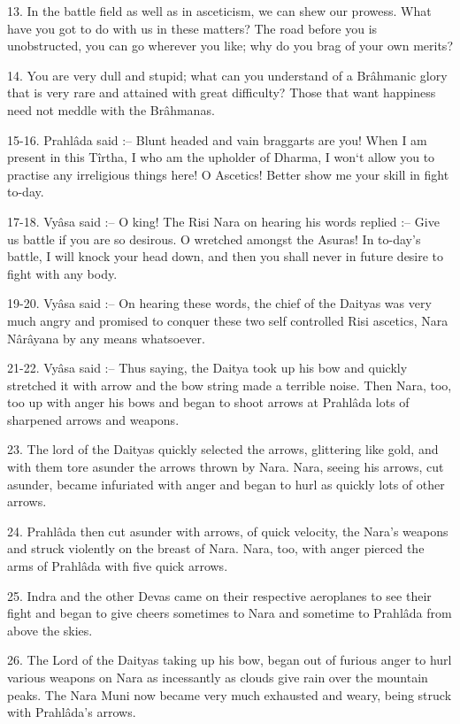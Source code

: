 13. In the battle field as well as in asceticism, we can shew our prowess. What have you got to do with us in these matters? The road before you is unobstructed, you can go wherever you like; why do you brag of your own merits?

14. You are very dull and stupid; what can you understand of a Br\^ahmanic glory that is very rare and attained with great difficulty? Those that want happiness need not meddle with the Br\^ahmanas.

15-16. Prahl\^ada said :-- Blunt headed and vain braggarts are you! When I am present in this T\^irtha, I who am the upholder of Dharma, I won`t allow you to practise any irreligious things here! O Ascetics! Better show me your skill in fight to-day.

17-18. Vy\^asa said :-- O king! The Risi Nara on hearing his words replied :-- Give us battle if you are so desirous. O wretched amongst the Asuras! In to-day's battle, I will knock your head down, and then you shall never in future desire to fight with any body.

19-20. Vy\^asa said :-- On hearing these words, the chief of the Daityas was very much angry and promised to conquer these two self controlled Risi ascetics, Nara N\^ar\^ayana by any means whatsoever.

21-22. Vy\^asa said :-- Thus saying, the Daitya took up his bow and quickly stretched it with arrow and the bow string made a terrible noise. Then Nara, too, too up with anger his bows and began to shoot arrows at Prahl\^ada lots of sharpened arrows and weapons.

23. The lord of the Daityas quickly selected the arrows, glittering like gold, and with them tore asunder the arrows thrown by Nara. Nara, seeing his arrows, cut asunder, became infuriated with anger and began to hurl as quickly lots of other arrows.

24. Prahl\^ada then cut asunder with arrows, of quick velocity, the Nara's weapons and struck violently on the breast of Nara. Nara, too, with anger pierced the arms of Prahl\^ada with five quick arrows.

25. Indra and the other Devas came on their respective aeroplanes to see their fight and began to give cheers sometimes to Nara and sometime to Prahl\^ada from above the skies.

26. The Lord of the Daityas taking up his bow, began out of furious anger to hurl various weapons on Nara as incessantly as clouds give rain over the mountain peaks. The Nara Muni now became very much exhausted and weary, being struck with Prahl\^ada's arrows.

